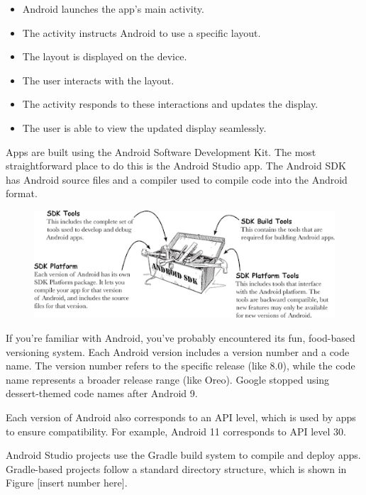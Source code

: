\begin{itemize} 
	\item Android launches the app’s main activity.
	\item The activity instructs Android to use a specific layout.
	\item The layout is displayed on the device.
	\item The user interacts with the layout.
	\item The activity responds to these interactions and updates the display.
	\item The user is able to view the updated display seamlessly.
\end{itemize}

Apps are built using the Android Software Development Kit. The most straightforward place to do this is the Android Studio app. The Android SDK has Android source files and a compiler used to compile code into the Android format.

\begin{figure}
	\centering
	\includegraphics[width=0.7\linewidth]{android_sdk_tools}
	\caption{}
	\label{fig:androidsdktools}
\end{figure}

If you’re familiar with Android, you’ve probably encountered its fun, food-based versioning system. Each Android version includes a version number and a code name. The version number refers to the specific release (like 8.0), while the code name represents a broader release range (like Oreo). Google stopped using dessert-themed code names after Android 9.

Each version of Android also corresponds to an API level, which is used by apps to ensure compatibility. For example, Android 11 corresponds to API level 30.

Android Studio projects use the Gradle build system to compile and deploy apps. Gradle-based projects follow a standard directory structure, which is shown in Figure [insert number here].


